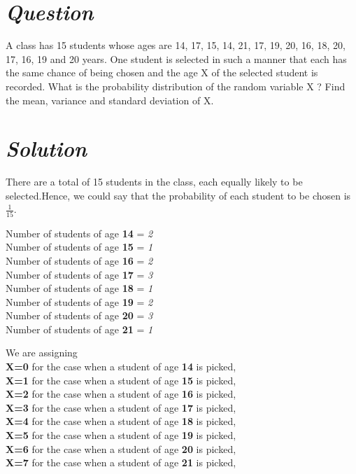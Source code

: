 \documentclass[journal,12pt,twocolumn]{IEEEtran}
\begin{document}
\section * {\emph{Question}}
A class has 15 students whose ages are 14, 17, 15, 14, 21, 17, 19, 20, 16, 18, 20, 17, 16, 19 and 20 years. One student is selected in such a manner that each has the same chance of being chosen and the age X of the selected student is recorded. What is the  probability distribution of the random variable X ? Find the  mean, variance and standard deviation of X.

\section*{\emph{Solution}}
There are a total of 15 students in the class, each equally likely to be selected.Hence, we could say that the probability of each student to be chosen is \textbf{$\frac{1}{15}$}.

   Number of students of age \textbf{14} = \emph{2}
\\ Number of students of age \textbf{15} = \emph{1}
\\ Number of students of age \textbf{16} = \emph{2}
\\ Number of students of age \textbf{17} = \emph{3}
\\ Number of students of age \textbf{18} = \emph{1}
\\ Number of students of age \textbf{19} = \emph{2}
\\ Number of students of age \textbf{20} = \emph{3}
\\ Number of students of age \textbf{21} = \emph{1}

We are assigning 
\\  \textbf{X=0} for the case when a student of age \textbf{14} is picked,
\\  \textbf{X=1} for the case when a student of age \textbf{15} is picked, 
\\  \textbf{X=2} for the case when a student of age \textbf{16} is picked,
\\  \textbf{X=3} for the case when a student of age \textbf{17} is picked,
\\  \textbf{X=4} for the case when a student of age \textbf{18} is picked,
\\  \textbf{X=5} for the case when a student of age \textbf{19} is picked,
\\  \textbf{X=6} for the case when a student of age \textbf{20} is picked,
\\  \textbf{X=7} for the case when a student of age \textbf{21} is picked,
\end{document}

